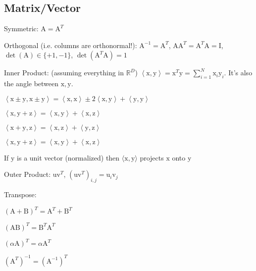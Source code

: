 \documentclass[a4paper, 11pt, landscape]{article}
\newcommand{\matr}[1]{\boldsymbol{\mathrm{#1}}}
\begin{document}
\begin{multicols*}{3}
\section{Matrix/Vector}
\begin{compactdesc}
	\item[Symmetric:] $\matr{A} = \matr{A}^T$
	\item[Orthogonal (i.e. columns are orthonormal!):] $\matr{A}^{-1} = \matr{A}^T$, $\matr{A} \matr{A}^T = \matr{A}^T \matr{A} = \matr{I}$, $\operatorname{det}(\matr{A}) \in \{+1, -1\}$, $\operatorname{det}(\matr{A}^T \matr{A}) = 1$
	\item[Inner Product:] (assuming everything in $\mathbb{R}^D$) $\left\langle \matr{x}, \matr{y} \right\rangle = \matr{x}^T \matr{y} = \sum_{i=1}^{N} \matr{x}_i \matr{y}_i$. It's also the angle between $\matr{x}, \matr{y}$.
	\begin{compactitem}
		\item $\left\langle \matr{x} \pm \matr{y}, \matr{x} \pm \matr{y} \right\rangle = \left\langle \matr{x}, \matr{x} \right\rangle \pm 2 \left\langle \matr{x}, \matr{y} \right\rangle + \left\langle \matr{y}, \matr{y} \right\rangle$
		\item $\left\langle \matr{x}, \matr{y} + \matr{z} \right\rangle = \left\langle \matr{x}, \matr{y} \right\rangle + \left\langle \matr{x}, \matr{z} \right\rangle$
		\item $\left\langle \matr{x} + \matr{y}, \matr{z} \right\rangle = \left\langle \matr{x}, \matr{z} \right\rangle + \left\langle \matr{y}, \matr{z} \right\rangle$
		\item $\left\langle \matr{x}, \matr{y} + \matr{z} \right\rangle = \left\langle \matr{x}, \matr{y} \right\rangle + \left\langle \matr{x}, \matr{z} \right\rangle$
		\item If $\matr{y}$ is a unit vector (normalized) then $\langle \matr{x}, \matr{y} \rangle$ projects $\matr{x}$ onto $\matr{y}$
	\end{compactitem}
	\item[Outer Product:] $\matr{u} \matr{v}^T$, $(\matr{u} \matr{v}^T)_{i, j} = \matr{u}_i \matr{v}_j$
	\item[Transpose:]\hfill
		\begin{compactitem}
			\item $(\matr{A} + \matr{B})^T = \matr{A}^T + \matr{B}^T$
			\item $(\matr{A}\matr{B})^T = \matr{B}^T \matr{A}^T$
			\item $(\alpha \matr{A})^T = \alpha \matr{A}^T$
			\item $(\matr{A}^T)^{-1} = (\matr{A}^{-1})^T$
		\end{compactitem}
\end{compactdesc}


\end{multicols*}
\end{document}
